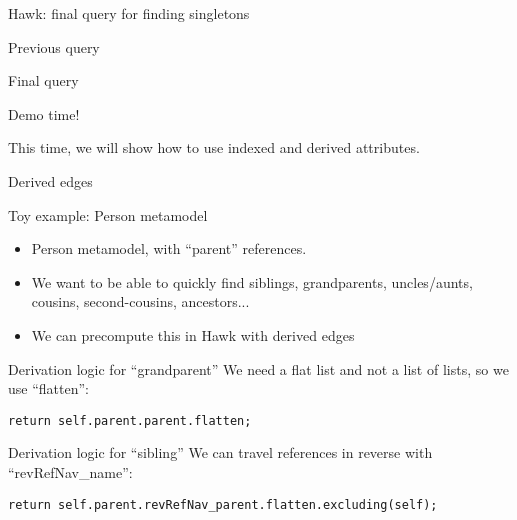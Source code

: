\begin{frame}[fragile]{Hawk: final query for finding singletons}
  \begin{block}{Previous query}
    
  \end{block}

  \begin{block}{Final query}
    
  \end{block}
\end{frame}

\begin{frame}[standout]
  Demo time!

  This time, we will show how to use indexed and derived attributes.
\end{frame}

\begin{frame}[fragile]{Derived edges}
  \begin{block}{Toy example: Person metamodel}
    \begin{itemize}
    \item Person metamodel, with ``parent'' references.
    \item We want to be able to quickly find siblings, grandparents,
      uncles/aunts, cousins, second-cousins, ancestors...
    \item We can precompute this in Hawk with \alert{derived edges}
    \end{itemize}
  \end{block}

  \begin{block}{Derivation logic for ``grandparent''}
    We need a flat list and not a list of lists, so we use ``flatten'':
    \begin{lstlisting}[language=EOL]
      return self.parent.parent.flatten;
    \end{lstlisting}
  \end{block}

  \begin{block}{Derivation logic for ``sibling''}
    We can travel references in reverse with ``revRefNav\_name'':

    \begin{lstlisting}[language=EOL]
      return self.parent.revRefNav_parent.flatten.excluding(self);
    \end{lstlisting}
  \end{block}

\end{frame}


